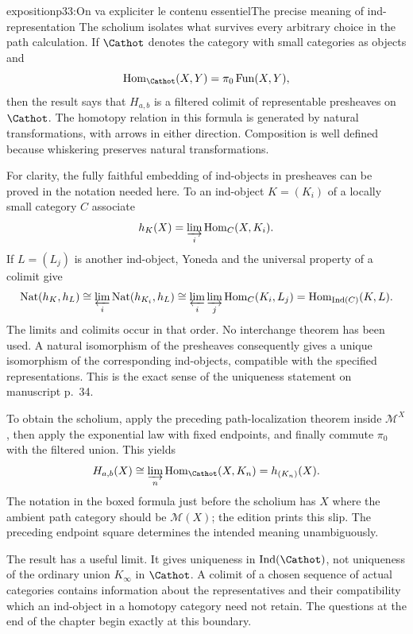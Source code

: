 \begin{dcomment}{exposition}{p33:On va expliciter le contenu essentiel}{The precise meaning of ind-representation}
The scholium isolates what survives every arbitrary choice in the path calculation. If $\Cathot$ denotes the category with small categories as objects and
\[
 \operatorname{Hom}_{\Cathot}(X,Y)
       =\pi_0\operatorname{Fun}(X,Y),
\]
then the result says that $H_{a,b}$ is a filtered colimit of representable presheaves on $\Cathot$. The homotopy relation in this formula is generated by natural transformations, with arrows in either direction. Composition is well defined because whiskering preserves natural transformations.

For clarity, the fully faithful embedding of ind-objects in presheaves can be proved in the notation needed here. To an ind-object $K=(K_i)$ of a locally small category $C$ associate
\[
 h_K(X)=\varinjlim_i\operatorname{Hom}_C(X,K_i).
\]
If $L=(L_j)$ is another ind-object, Yoneda and the universal property of a colimit give
\[
 \operatorname{Nat}(h_K,h_L)
 \cong\varprojlim_i\operatorname{Nat}(h_{K_i},h_L)
 \cong\varprojlim_i\varinjlim_j\operatorname{Hom}_C(K_i,L_j)
 =\operatorname{Hom}_{\operatorname{Ind}(C)}(K,L).
\]
The limits and colimits occur in that order. No interchange theorem has been used. A natural isomorphism of the presheaves consequently gives a unique isomorphism of the corresponding ind-objects, compatible with the specified representations. This is the exact sense of the uniqueness statement on manuscript p.~34.

To obtain the scholium, apply the preceding path-localization theorem inside $\mathcal M^X$, then apply the exponential law with fixed endpoints, and finally commute $\pi_0$ with the filtered union. This yields
\[
 H_{a,b}(X)
  \cong\varinjlim_n\operatorname{Hom}_{\Cathot}(X,K_n)
  =h_{(K_n)}(X).
\]
The notation in the boxed formula just before the scholium has $X$ where the ambient path category should be $\mathcal M(X)$; the edition prints this slip. The preceding endpoint square determines the intended meaning unambiguously.

The result has a useful limit. It gives uniqueness in $\operatorname{Ind}(\Cathot)$, not uniqueness of the ordinary union $K_\infty$ in $\Cathot$. A colimit of a chosen sequence of actual categories contains information about the representatives and their compatibility which an ind-object in a homotopy category need not retain. The questions at the end of the chapter begin exactly at this boundary.
\end{dcomment}

